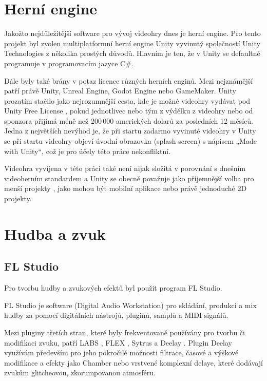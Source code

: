 \section{Herní engine}
\label{sec:herni-engine}
Jakožto nejdůležitější software pro vývoj videohry dnes je herní engine. Pro tento projekt byl zvolen multiplatformní herní engine Unity vyvinutý společností Unity Technologies \cite{unity} z několika prostých důvodů. Hlavním je ten, že v Unity se defaultně programuje v programovacím jazyce C\#.

Dále byly také brány v potaz licence různých herních enginů. Mezi nejznámější patří právě Unity, Unreal Engine, Godot Engine nebo GameMaker. Unity prozatím stačilo jako nejrozumnější cesta, kde je možné videohry vydávat pod Unity Free License \cite{unity-pricing}, pokud jednotlivec nebo tým z výdělku z videohry nebo od sponzora přijímá méně než 200 000 amerických dolarů za posledních 12 měsíců. Jedna z největších nevýhod je, že při startu zadarmo vyvinuté videohry v Unity se při startu videohry objeví úvodní obrazovka (splash screen) s nápisem „Made with Unity“, což je pro účely této práce nekonfliktní.

Videohra vyvíjena v této práci také není nijak složitá v porovnání s dnešním videoherním standardem a Unity se obecně považuje jako příjemnější volba pro menší projekty \cite{unity-small-projects}, jako mohou být mobilní aplikace nebo právě jednoduché 2D projekty.

\section{Hudba a zvuk}

\subsection{FL Studio}
Pro tvorbu hudby a zvukových efektů byl použit program FL Studio.

FL Studio je software (Digital Audio Workstation) pro skládání, produkci a mix hudby za pomocí digitálních nástrojů, pluginů, samplů a MIDI signálů.

Mezi pluginy třetích stran, které byly frekventovaně používány pro tvorbu či modifikaci zvuku, patří LABS \cite{labs}, FLEX \cite{flex}, Sytrus \cite{sytrus} a Deelay \cite{deelay}. Plugin Deelay využívám především pro jeho pokročilé možnosti filtrace, časové a výškové modifikace a efekty jako Chamber nebo vrstvené komplexní delaye, které dodávají zvukům glitcheovou, zkorumpovanou atmosféru. \cite{flstudio}

